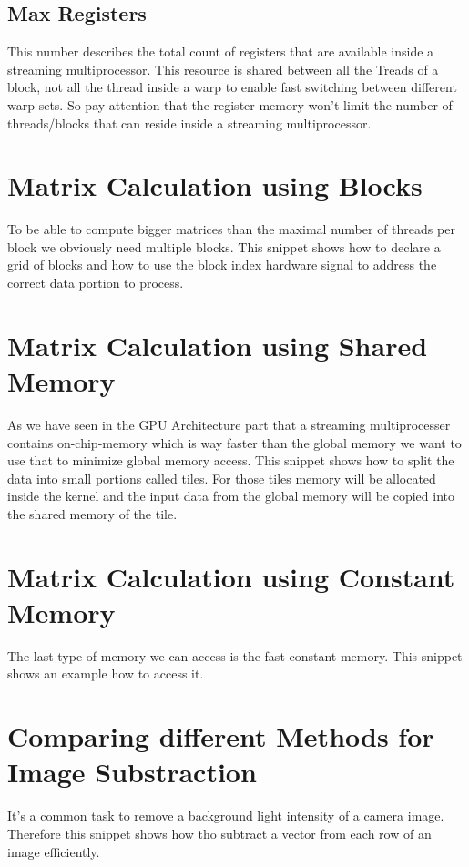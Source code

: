 \subsection{Max Registers}
This number describes the total count of registers that are available inside a streaming multiprocessor. This resource is shared between all the Treads of a block, not all the thread inside a warp to enable fast switching between different warp sets. So pay attention that the register memory won't limit the number of threads/blocks that can reside inside a streaming multiprocessor.


\section{Matrix Calculation using Blocks}
To be able to compute bigger matrices than the maximal number of threads per block we obviously need multiple blocks. This snippet shows how to declare a grid of blocks and how to use the block index hardware signal to address the correct data portion to process.


\section{Matrix Calculation using Shared Memory}
As we have seen in the GPU Architecture part that a streaming multiprocesser contains on-chip-memory which is way faster than the global memory we want to use that to minimize global memory access. This snippet shows how to split the data into small portions called tiles. For those tiles memory will be allocated inside the kernel and the input data from the global memory will be copied into the shared memory of the tile.


\section{Matrix Calculation using Constant Memory}
The last type of memory we can access is the fast constant memory. This snippet shows an example how to access it.
\pagebreak

\section{Comparing different Methods for Image Substraction}
It's a common task to remove a background light intensity of a camera image. Therefore this snippet shows how tho subtract a vector from each row of an image efficiently.

